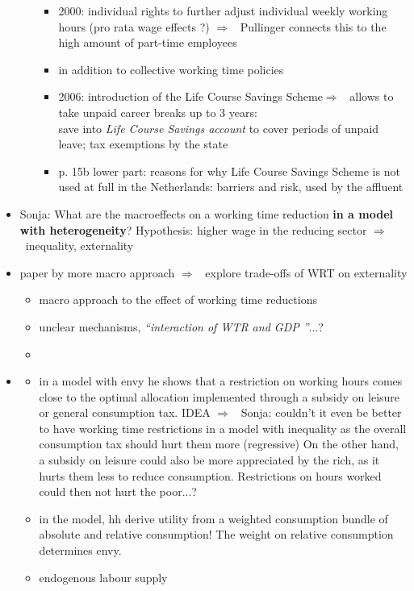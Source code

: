 \documentclass[12pt]{article}
\newcommand{\ar}{$\Rightarrow$ \ }
\begin{document}
\begin{itemize}
\begin{itemize}
\begin{itemize}
\item 2000: individual rights to further adjust individual weekly working hours (pro rata wage effects ?) \ar Pullinger connects this to the high amount of part-time employees
\item in addition to collective working time policies
\item 2006: introduction of the Life Course Savings Scheme\ar allows to take unpaid career breaks up to 3 years: \\
save into \textit{Life Course Savings account} to cover periods of unpaid leave; tax exemptions by the state
\item p. 15b lower part: reasons for why Life Course Savings Scheme is not used at full in the Netherlands: barriers and risk, used by the affluent
\end{itemize}
\end{itemize}
\item Sonja: What are the macroeffects on a working time reduction \textbf{in a model with heterogeneity}? Hypothesis: higher wage in the reducing sector \ar inequality, externality
\item paper by \cite{Cieplinski2021EnvironmentalReductionb} more macro approach \ar explore trade-offs of WRT on externality
\begin{itemize}
\item macro approach to the effect of working time reductions
\item unclear mechanisms, \textit{``interaction of WTR and GDP ''}...?
\item 
\end{itemize}
\item \cite{Alvarez-Cuadrado2007EnvyHours}
\begin{itemize}
\item in a model with envy he shows that a restriction on working hours comes close to the optimal allocation implemented through a subsidy on leisure or general consumption tax.
IDEA \ar Sonja: couldn't it even be better to have working time restrictions in a model with inequality as the overall consumption tax should hurt them more (regressive) On the other hand, a subsidy on leisure could also be more appreciated by the rich, as it hurts them less to reduce consumption. Restrictions on hours worked could then not hurt the poor...?
\item in the model, hh derive utility from a weighted consumption bundle of absolute and relative consumption! The weight on relative consumption determines envy.
\item endogenous labour supply

\end{itemize}
\end{itemize}
\end{document}
